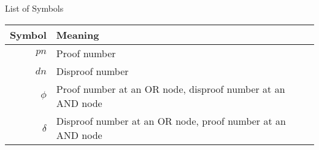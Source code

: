 \documentclass[12pt, letterpaper]{report}
\numberwithin{equation}{section}
\begin{document}
  \setcounter{page}{-99}  %
  \thispagestyle{empty}


  


  \newpage
  \normalsize
  \tableofcontents

  \newpage
  \listoffigures

  \newpage
  \listoftables

  \newpage
  \thispagestyle{empty}
  \section*{}
  \begin{flushright}
    \huge{List of Symbols}
  \end{flushright}
  \vspace{0.4in}
  \begin{center}
    \begin{tabular}{rl}
      Symbol & Meaning\\
      \hline
      $pn$           & Proof number \\
      $dn$           & Disproof number \\
      $\phi$         & Proof number at an OR node, disproof number at an AND node \\
      $\delta$       & Disproof number at an OR node, proof number at an AND node \\
    \end{tabular}
  \end{center}

  \newpage
  \thispagestyle{empty}
\end{document}
